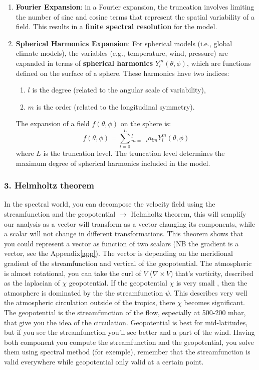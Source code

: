 \begin{enumerate}
    \item \textbf{Fourier Expansion}: in a Fourier expansion, the truncation involves limiting the number of sine and cosine terms that represent the spatial variability of a field. This results in a \textbf{finite spectral resolution} for the model.
    \item \textbf{Spherical Harmonics Expansion}: For spherical models (i.e., global climate models), the variables (e.g., temperature, wind, pressure) are expanded in terms of \textbf{spherical harmonics} $Y_l^m(\theta,\phi)$, which are functions defined on the surface of a sphere. These harmonics have two indices:
        \begin{enumerate}
            \item  $l$ is the degree (related to the angular scale of variability),
            \item $m$ is the order (related to the longitudinal symmetry).
        \end{enumerate}
        The expansion of a field $f(\theta,\phi)$ on the sphere is: $$f(\theta,\phi)=\displaystyle\sum_{l=0}^L\displaystyle_{m=-l}^la_{lm}Y_l^m(\theta,\phi)$$
        where $L$ is the truncation level. The truncation level determines the maximum degree of spherical harmonics included in the model.
\end{enumerate}

\subsubsection{3. \textbf{Helmholtz theorem}}
In the spectral world, you can decompose the velocity field using the streamfunction and the geopotential $\rightarrow$ Helmholtz theorem, this will semplify our analysis as a  vector will transform as a vector changing its components, while a scalar will not change in different transformations. This theorem shows that you could represent a vector as function of two scalars (NB the gradient is a vector, see the Appendix\ref{app}). The vector is depending on the meridional gradient of the streamfunction and vertical of the geopotential. The atmospheric is almost rotational, you can take the curl of $V$ ($\nabla \times V$) that's vorticity, described as the laplacian of $\chi$ geopotential. If the geopotential $\chi$ is very small , then the atmosphere is dominated by the the streamfunction $\psi$. This describes very well the atmospheric circulation outside of the tropics, there $\chi$ becomes significant. The geopotential is the streamfunction of the flow, especially at 500-200 mbar, that give you the idea of the circulation. Geopotential is best for mid-latitudes, but if you see the streamfunction you'll see better and a part of the wind. Having both component you compute the streamfunction and the geopotential, you solve them using spectral method (for exemple), remember that the streamfunction is valid everywhere while geopotential only valid at a certain point.
